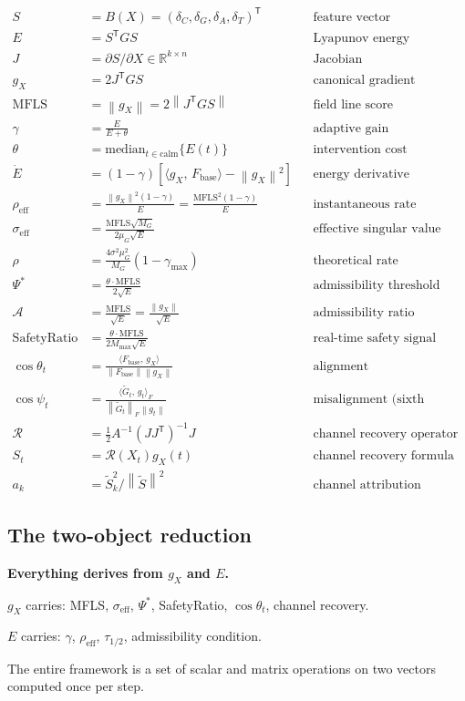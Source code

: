 \documentclass[11pt,a4paper]{article}
\theoremstyle{definition}
\newcommand{\R}{\mathbb{R}}
\newcommand{\T}{^{\mathsf{T}}}
\newcommand{\norm}[1]{\left\|#1\right\|}
\newcommand{\inner}[2]{\langle #1,\,#2\rangle}
\newcommand{\Fbase}{F_{\mathrm{base}}}
\newcommand{\gX}{g_X}
\newcommand{\mfls}{\mathrm{MFLS}}
\begin{document}
\begin{resultbox}
\begin{align*}
S &= B(X) = (\delta_C,\delta_G,\delta_A,\delta_T)\T &&\text{feature vector} \\[4pt]
E &= S\T GS &&\text{Lyapunov energy} \\[4pt]
J &= \partial S/\partial X \in \R^{k\times n} &&\text{Jacobian} \\[4pt]
\gX &= 2J\T GS &&\text{canonical gradient} \\[4pt]
\mfls &= \norm{\gX} = 2\norm{J\T GS} &&\text{field line score} \\[4pt]
\gamma &= \frac{E}{E+\theta} &&\text{adaptive gain} \\[4pt]
\theta &= \mathrm{median}_{t\in\text{calm}}\{E(t)\} &&\text{intervention cost} \\[4pt]
\dot E &= (1-\gamma)\left[\inner{\gX}{\Fbase}-\norm{\gX}^2\right] &&\text{energy derivative} \\[4pt]
\rho_\mathrm{eff} &= \frac{\norm{\gX}^2(1-\gamma)}{E} = \frac{\mfls^2(1-\gamma)}{E} &&\text{instantaneous rate} \\[4pt]
\sigma_\mathrm{eff} &= \frac{\mfls\sqrt{M_G}}{2\mu_G\sqrt{E}} &&\text{effective singular value} \\[4pt]
\rho &= \frac{4\sigma^2\mu_G^2}{M_G}(1-\gamma_\mathrm{max}) &&\text{theoretical rate} \\[4pt]
\Psi^* &= \frac{\theta\cdot\mfls}{2\sqrt{E}} &&\text{admissibility threshold} \\[4pt]
\mathcal{A} &= \frac{\mfls}{\sqrt{E}} = \frac{\norm{\gX}}{\sqrt{E}} &&\text{admissibility ratio} \\[4pt]
\text{SafetyRatio} &= \frac{\theta\cdot\mfls}{2M_\mathrm{max}\sqrt{E}} &&\text{real-time safety signal} \\[4pt]
\cos\theta_t &= \frac{\inner{\Fbase}{\gX}}{\norm{\Fbase}\norm{\gX}} &&\text{alignment} \\[4pt]
\cos\psi_t &= \frac{\inner{\tilde G_t}{g_t}_F}{\norm{\tilde G_t}_F\norm{g_t}} &&\text{misalignment (sixth signal)} \\[4pt]
\mathcal{R} &= \frac{1}{2}A^{-1}(JJ\T)^{-1}J &&\text{channel recovery operator} \\[4pt]
S_t &= \mathcal{R}(X_t)\gX(t) &&\text{channel recovery formula} \\[4pt]
a_k &= \tilde S_k^2/\norm{\tilde S}^2 &&\text{channel attribution}
\end{align*}
\end{resultbox}

\subsection{The two-object reduction}

\textbf{Everything derives from $\gX$ and $E$.}

$\gX$ carries: MFLS, $\sigma_\mathrm{eff}$, $\Psi^*$, SafetyRatio, $\cos\theta_t$, channel recovery.

$E$ carries: $\gamma$, $\rho_\mathrm{eff}$, $\tau_{1/2}$, admissibility condition.

The entire framework is a set of scalar and matrix operations on two vectors computed once per step.
\end{document}
